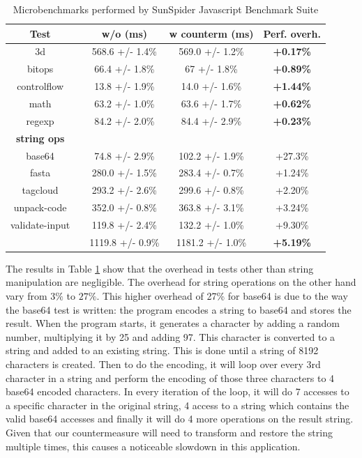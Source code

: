 \begin{table}[htdp] 
\begin{center}
\begin{tabular}{|cl|c|c|c|}
\hline
\bf{Test} 		& & \bf{w/o (ms)} 			& \bf{w counterm (ms)}  		& \bf{Perf. overh.} \\
\hline
3d &                 	&                568.6 +/- 1.4\%  	&   569.0 +/- 1.2\%    	&   \bf{+0.17\%}\\
\hline
bitops &         		&          66.4 +/- 1.8\%   	&  67 +/- 1.8\%    	&\bf{+0.89\%}  \\
\hline
controlflow  &   &     13.8 +/- 1.9\% 	&    14.0 +/- 1.6\% 	&	\bf{+1.44\%} \\
\hline
math &         	&      	 63.2 +/- 1.0\%    	& 	63.6 +/- 1.7\%  	&\bf{+0.62\%}\\
\hline
 regexp &         &        84.2 +/- 2.0\% &    84.4 +/- 2.9\%  &   \bf{+0.23\%} \\
\hline
\bf{string ops} &&& & \\
    base64   	&  &          74.8 +/- 2.9\%		&  102.2 +/- 1.9\%  		&  	+27.3\%\\
    fasta      	&   &      280.0 +/- 1.5\%   	& 283.4 +/- 0.7\%  	  	&	+1.24\%\\
    tagcloud     &	&     	 293.2 +/- 2.6\%   		&  299.6 +/- 0.8\%  		& 	+2.20\%\\
    unpack-code  & &    352.0 +/- 0.8\%   		&  363.8 +/- 3.1\%  		& 	+3.24\%\\
    validate-input  & &   119.8 +/- 2.4\%  		&   132.2 +/- 1.0\% 		&  	 +9.30\%\\
\hline
&      		&         1119.8 +/- 0.9\%  		&  1181.2 +/- 1.0\%  	& \bf{+5.19\%} \\ 
\hline
\end{tabular}
\end{center}
\caption{{ Microbenchmarks performed by SunSpider Javascript Benchmark Suite}}
\vspace{0.3cm}
\label{sunbench}
\end{table}

The results in Table \ref{sunbench} show that the overhead in tests other than string manipulation are negligible.
The overhead for string operations on the other hand vary from $3\%$  to $27\%$.  This higher overhead of 27\% for base64 is due to the way the base64 test is written: the program encodes a string to base64 and stores the result. When the program starts, it generates a character by adding a random number, multiplying it by 25 and adding 97. This character is converted to a string and added to an existing string. This is done until a string of 8192 characters is created. Then to do the encoding, it will loop over every 3rd character in a string and perform the encoding of those three characters to 4 base64 encoded characters. In every iteration of the loop, it will do 7 accesses to a specific character in the original string, 4 access to a string which contains the valid base64 accesses and finally it will do 4 more operations on the result string. Given that our countermeasure will need to transform and restore the string multiple times, this causes a noticeable slowdown in this application.

